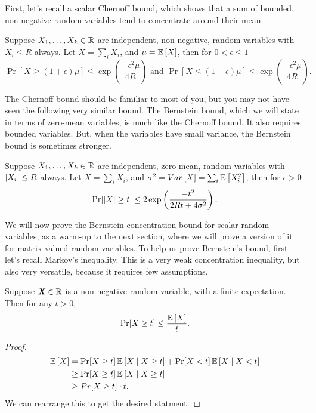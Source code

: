 First, let's recall a scalar Chernoff bound, which shows that a sum of
bounded, non-negative random variables tend to concentrate around
their mean.
\begin{theorem}
Suppose $X_1, \ldots, X_k \in \mathbb{R}$ are independent, non-negative,
random variables with $X_i \leq R$ always.
Let $X = \sum_i X_i$, and $\mu = \mathop{{}\mathbb{E}}\left[X\right]$,
then for $0 < \epsilon \leq 1$
\[
\Pr[ X \geq (1+\epsilon) \mu ] \leq \exp\left(\frac{-\epsilon^2
    \mu}{4R}\right)
\text{ and }
\Pr[ X \leq (1-\epsilon) \mu] \leq \exp\left(\frac{-\epsilon^2
    \mu}{4R}\right)
.
  \]
\end{theorem}
The Chernoff bound should be familiar to most of you, but you may not
have seen the following very similar bound.
The Bernstein bound, which we will state in terms of zero-mean
variables, is much like the Chernoff bound.
It also requires bounded variables.
But, when the variables have small variance, the Bernstein bound is
sometimes stronger.
\begin{theorem}
  \label{thm:bernstein}
  Suppose $X_1, \ldots, X_k \in \mathbb{R}$ are independent, zero-mean,
random variables with $\left|X_i \right| \leq R$ always.
Let $X = \sum_i X_i$, and $\sigma^2 = \mathop{{}Var}\left[X\right] = \sum_i \mathop{{}\mathbb{E}}\left[X_i^2\right]$,
then for $\epsilon > 0$
\[
\Pr[ \left|X \right| \geq t] \leq 2\exp\left(\frac{-t^2}{2Rt +
    4\sigma^2}\right)
.
  \]
\end{theorem}
We will now prove the Bernstein concentration bound for scalar random
variables, as a warm-up to the next section, where we will prove a version
of it for matrix-valued random variables.
To help us prove Bernstein's bound, first let's recall Markov's
inequality.
This is a very weak concentration inequality, but also very versatile,
because it requires few assumptions.
\begin{lemma}
  \label{lem:markov}
  Suppose $\boldsymbol{\mathit{X}} \in \mathbb{R}$ is a non-negative random variable, with a finite
  expectation.
  Then for any $t > 0$,
  \[
    \Pr[ X \geq t] \leq \frac{\mathop{{}\mathbb{E}}\left[X\right]}{t}
    .
    \]
\end{lemma}
\begin{proof}
  \begin{align*}
    \mathop{{}\mathbb{E}}\left[X\right]
    &=
      \Pr[X \geq t]\mathop{{}\mathbb{E}}\left[X \mid X \geq t\right] + \Pr[X < t]\mathop{{}\mathbb{E}}\left[X \mid X < t\right]
   \\
    &\geq \Pr[X \geq t]\mathop{{}\mathbb{E}}\left[X \mid X \geq t\right]
    \\
    &\geq Pr[X \geq t] \cdot t
      .
\end{align*}
  We can rearrange this to get the desired statment.
\end{proof}
